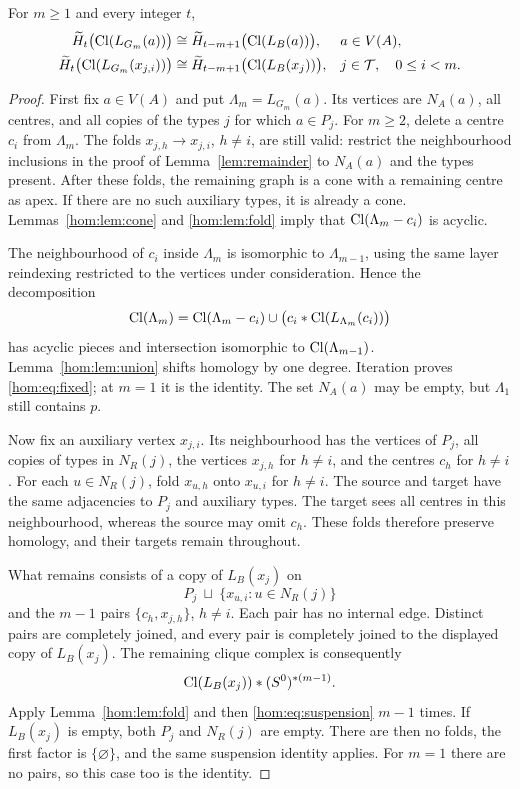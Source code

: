 \begin{theorem}\label{hom:thm:shift}
For \(m\geq1\) and every integer \(t\),
\begin{align}
 \widetilde H_t\bigl(\operatorname{Cl}(L_{G_m}(a))\bigr)
 &\cong\widetilde H_{t-m+1}\bigl(\operatorname{Cl}(L_B(a))\bigr),
 &&a\in V(A),\label{hom:eq:fixed}\\
 \widetilde H_t\bigl(\operatorname{Cl}(L_{G_m}(x_{j,i}))\bigr)
 &\cong\widetilde H_{t-m+1}\bigl(\operatorname{Cl}(L_B(x_j))\bigr),
 &&j\in \mathcal{T},\quad 0\leq i<m.\label{hom:eq:auxiliary}
\end{align}
\end{theorem}
\begin{proof}
First fix \(a\in V(A)\) and put \(\Lambda_m=L_{G_m}(a)\).
Its vertices are \(N_A(a)\), all centres, and all copies of the
types \(j\) for which \(a\in P_j\). For \(m\geq2\), delete a centre
\(c_i\) from \(\Lambda_m\). The folds \(x_{j,h}\to x_{j,i}\), \(h\ne i\),
are still valid: restrict the neighbourhood inclusions in the proof of
Lemma~\ref{lem:remainder} to \(N_A(a)\) and the types present.
After these folds, the remaining graph is a cone with a remaining
centre as apex.
If there are no such auxiliary types, it is already a cone.
Lemmas~\ref{hom:lem:cone} and \ref{hom:lem:fold} imply that
\(\operatorname{Cl}(\Lambda_m-c_i)\) is acyclic.

The neighbourhood of \(c_i\) inside \(\Lambda_m\) is isomorphic to
\(\Lambda_{m-1}\), using the same layer reindexing restricted to the
vertices under consideration. Hence the decomposition
\[
 \operatorname{Cl}(\Lambda_m)=\operatorname{Cl}(\Lambda_m-c_i)
       \cup\bigl(c_i*\operatorname{Cl}(L_{\Lambda_m}(c_i))\bigr)
\]
has acyclic pieces and intersection isomorphic to \(\operatorname{Cl}(\Lambda_{m-1})\).
Lemma~\ref{hom:lem:union} shifts homology by one degree. Iteration
proves \eqref{hom:eq:fixed}; at \(m=1\) it is the identity.
The set \(N_A(a)\) may be empty, but \(\Lambda_1\) still contains \(p\).

Now fix an auxiliary vertex \(x_{j,i}\). Its neighbourhood has
the vertices of \(P_j\), all copies of types in \(N_R(j)\),
the vertices \(x_{j,h}\) for \(h\ne i\), and the centres \(c_h\)
for \(h\ne i\). For each \(u\in N_R(j)\), fold
\(x_{u,h}\) onto \(x_{u,i}\) for \(h\ne i\). The source and
target have the same adjacencies to \(P_j\) and auxiliary types.
The target sees all centres in this neighbourhood, whereas
the source may omit \(c_h\). These folds therefore preserve
homology, and their targets remain throughout.

What remains consists of a copy of \(L_B(x_j)\) on
\[
 P_j\ \sqcup\ \{x_{u,i}:u\in N_R(j)\}
\]
and the \(m-1\) pairs \(\{c_h,x_{j,h}\}\), \(h\ne i\).
Each pair has no internal edge. Distinct pairs are completely
joined, and every pair is completely joined to the displayed copy
of \(L_B(x_j)\). The remaining clique complex is consequently
\[
 \operatorname{Cl}(L_B(x_j))*(S^0)^{*(m-1)}.
\]
Apply Lemma~\ref{hom:lem:fold} and then \eqref{hom:eq:suspension}
\(m-1\) times. If \(L_B(x_j)\) is empty, both \(P_j\) and
\(N_R(j)\) are empty. There are then no folds, the first factor is
\(\{\varnothing\}\), and the same suspension identity applies.
For \(m=1\) there are no pairs, so this case too is the identity.
\end{proof}


